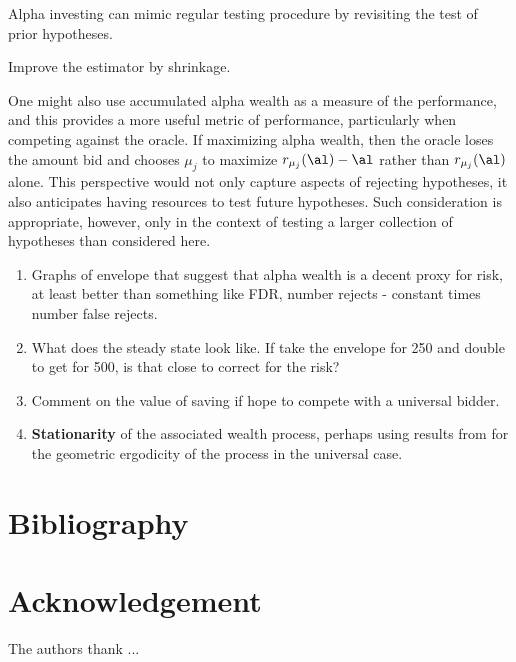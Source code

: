 \documentclass[12pt]{article}
\begin{document}
Alpha investing can mimic regular testing procedure by revisiting the test of
prior hypotheses. 

Improve the estimator by shrinkage.



 One might also use accumulated alpha wealth as a measure of the performance, and
 this provides a more useful metric of performance, particularly when competing
 against the oracle.  If maximizing alpha wealth, then the oracle loses the
 amount bid and chooses $\mu_j$ to maximize $r_{\mu_j}(\al)-\al$ rather than
 $r_{\mu_j}(\al)$ alone.  This perspective would not only capture aspects of
 rejecting hypotheses, it also anticipates having resources to test future
 hypotheses.  Such consideration is appropriate, however, only in the context of
 testing a larger collection of hypotheses than considered here.

 \begin{enumerate}

 \item Graphs of envelope that suggest that alpha wealth is a decent proxy for
 risk, at least better than something like FDR, number rejects - constant times
 number false rejects.

 \item What does the steady state look like.  If take the envelope for 250 and
 double to get for 500, is that close to correct for the risk?

 \item Comment on the value of saving if hope to compete with a universal
 bidder.
 
\item {\bf Stationarity} of the associated wealth process, perhaps using results
 from \citet{chanTong94} for the geometric ergodicity of the process in the
 universal case.

\end{enumerate}



\section{ Bibliography }
\section*{Acknowledgement}

The authors thank ...





\end{document}
